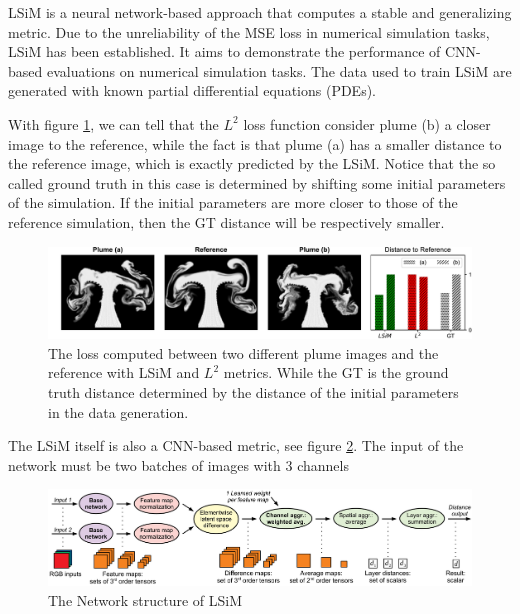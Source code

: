 \documentclass[a4paper,12pt,twoside]{report}
\begin{document}
LSiM \cite{kohl2020learning} is a neural network-based approach that computes a stable and generalizing metric. Due to the unreliability of the MSE loss in numerical simulation tasks, LSiM has been established. It aims to demonstrate the performance of CNN-based evaluations on numerical simulation tasks. The data used to train LSiM are generated with known partial differential equations (PDEs). 

With figure \ref{lsimcompare}, we can tell that the $L^2$ loss function consider plume (b) a closer image to the reference, while the fact is that plume (a) has a smaller distance to the reference image, which is exactly predicted by the LSiM. Notice that the so called ground truth in this case is determined by shifting some initial parameters of the simulation. If the initial parameters are more closer to those of the reference simulation, then the GT distance will be respectively smaller.

\begin{figure}
\centering
\includegraphics[width=1.0\textwidth]{Plumes.pdf}
\caption{The loss computed between two different plume images and the reference with LSiM and $L^2$ metrics. While the GT is the ground truth distance determined by the distance of the initial parameters in the data generation. }
\label{lsimcompare}
\end{figure}
The LSiM itself is also a CNN-based metric, see figure \ref{lsim}. The input of the network must be two batches of images with 3 channels
\begin{figure}
\centering
\includegraphics[width=1.0\textwidth]{DistanceComputation.pdf}
\caption{The Network structure of LSiM}
\label{lsim}
\end{figure}
\end{document}
